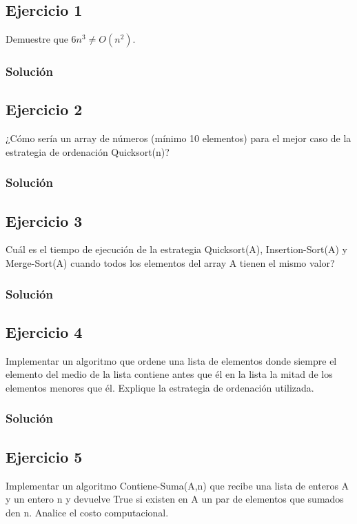 \documentclass{article}
\begin{document}



\subsection*{Ejercicio 1}
Demuestre que $6n^3 \neq O(n^2)$.
\subsubsection*{Solución}


\subsection*{Ejercicio 2}
¿Cómo sería un array de números (mínimo 10 elementos) para el mejor caso de la estrategia de ordenación Quicksort(n)?
\subsubsection*{Solución}


\subsection*{Ejercicio 3}
Cuál es el tiempo de ejecución de la estrategia Quicksort(A), Insertion-Sort(A) y Merge-Sort(A) cuando todos los elementos del array A tienen el mismo valor?
\subsubsection*{Solución}


\subsection*{Ejercicio 4}
Implementar un algoritmo que ordene una lista de elementos donde siempre el elemento del medio de la lista contiene antes que él en la lista la mitad de los elementos menores que él. Explique la estrategia de ordenación utilizada.
\subsubsection*{Solución}


\subsection*{Ejercicio 5}
Implementar un algoritmo Contiene-Suma(A,n) que recibe una lista de enteros A y un entero n y devuelve True si existen en A un par de elementos que sumados den n. Analice el costo computacional.
\end{document}
